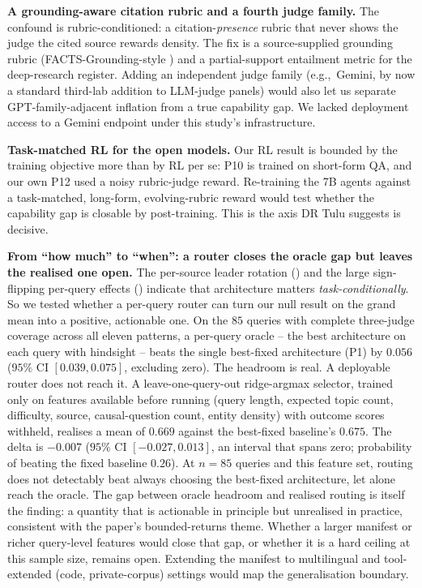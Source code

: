 \documentclass[11pt]{article}
\newcommand{\eg}{e.g.,\ }
\begin{document}
\textbf{A grounding-aware citation rubric and a fourth judge family.} The
 confound is rubric-conditioned: a citation-\emph{presence} rubric
that never shows the judge the cited source rewards density. The fix is a source-supplied
grounding rubric (FACTS-Grounding-style \citep{factsgrounding2025}) and a partial-support
entailment metric for the deep-research register. Adding an independent judge
family (\eg Gemini, by now a standard third-lab addition to LLM-judge panels) would also
let us separate GPT-family-adjacent inflation from a true
capability gap. We lacked deployment access to a Gemini endpoint under this study's
infrastructure.

\textbf{Task-matched RL for the open models.} Our RL result is bounded by the training
objective more than by RL per se: P10 is trained on short-form QA, and our own P12 used a
noisy rubric-judge reward. Re-training the 7B agents against a task-matched, long-form,
evolving-rubric reward \citep{shao2025drtulu} would test whether the capability gap is
closable by post-training. This is the axis DR Tulu suggests is decisive.

\textbf{From ``how much'' to ``when'': a router closes the oracle gap but leaves the
realised one open.} The per-source leader rotation () and the large
sign-flipping per-query effects () indicate that architecture matters
\emph{task-conditionally}. So we tested whether a per-query router can turn our null result
on the grand mean into a positive, actionable one.
On the $85$ queries with complete three-judge coverage across all eleven patterns, a
per-query oracle -- the best architecture on each query with hindsight -- beats the single
best-fixed architecture (P1) by $0.056$ ($95\%$ CI $[0.039, 0.075]$, excluding zero). The
headroom is real. A deployable router does not reach it. A leave-one-query-out
ridge-argmax selector, trained only on features available before running (query length,
expected topic count, difficulty, source, causal-question count, entity density) with
outcome scores withheld, realises a mean of $0.669$ against the best-fixed baseline's
$0.675$. The delta is $-0.007$ ($95\%$ CI $[-0.027, 0.013]$, an interval that spans zero;
probability of beating the fixed baseline $0.26$). At $n{=}85$ queries and this feature set, routing does not detectably beat
always choosing the best-fixed architecture, let alone reach the oracle. The gap between
oracle headroom and realised routing is itself the finding: a quantity that is actionable in
principle but unrealised in practice, consistent with the paper's bounded-returns theme. Whether a
larger manifest or richer query-level features would close that gap, or whether it is a hard
ceiling at this sample size, remains open. Extending the manifest to
multilingual and tool-extended (code, private-corpus) settings would map the
generalisation boundary.
\end{document}
